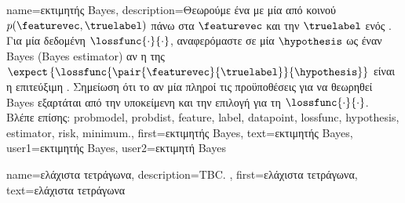 {name={\foreignlanguage{greek}{εκτιμητής} Bayes},
	description={\foreignlanguage{greek}{Θεωρούμε ένα} 
		 \foreignlanguage{greek}{με μία από κοινού}  $p(\featurevec,\truelabel)$ 
		\foreignlanguage{greek}{πάνω στα}  $\featurevec$ \foreignlanguage{greek}{και την}  
		$\truelabel$ \foreignlanguage{greek}{ενός} . \foreignlanguage{greek}{Για μία δεδομένη} 
		 $\lossfunc{\cdot}{\cdot}$, \foreignlanguage{greek}{αναφερόμαστε σε μία}  
		$\hypothesis$ \foreignlanguage{greek}{ως έναν}  Bayes (Bayes estimator) \foreignlanguage{greek}{αν η} 
		 \foreignlanguage{greek}{της $\expect\left\{\lossfunc{\pair{\featurevec}{\truelabel}}{\hypothesis}\right\}$ είναι η} 
		 \foreignlanguage{greek}{επιτεύξιμη}  \cite{LC}. \foreignlanguage{greek}{Σημείωση 
		ότι το αν μία}  \foreignlanguage{greek}{πληροί τις προϋποθέσεις για να θεωρηθεί}  
		Bayes \foreignlanguage{greek}{εξαρτάται από την υποκείμενη}  \foreignlanguage{greek}{και την επιλογή για 
		τη}  $\lossfunc{\cdot}{\cdot}$.
		\\
		\foreignlanguage{greek}{Βλέπε επίσης:} \gls{probmodel}, \gls{probdist}, \gls{feature}, \gls{label}, \gls{datapoint}, \gls{lossfunc}, 
		\gls{hypothesis}, \gls{estimator}, \gls{risk}, \gls{minimum}.},
	first={\foreignlanguage{greek}{εκτιμητής} Bayes},
	text={\foreignlanguage{greek}{εκτιμητής} Bayes},
	user1={\foreignlanguage{greek}{εκτιμητής} Bayes}, %
    	user2={\foreignlanguage{greek}{εκτιμητή} Bayes} %
}

{name={\foreignlanguage{greek}{ελάχιστα τετράγωνα}},
	description={TBC. },
	first={\foreignlanguage{greek}{ελάχιστα τετράγωνα}},
	text={\foreignlanguage{greek}{ελάχιστα τετράγωνα}}
}


